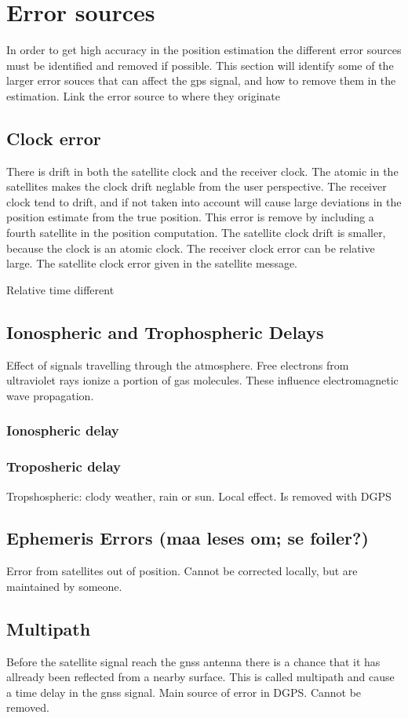 \section{Error sources}
In order to get high accuracy in the position estimation the different error sources must be identified and removed if possible. This section will identify some of the larger error souces that can affect the gps signal, and how to remove them in the estimation.
Link the error source to where they originate
\subsection{Clock error}
There is drift in both the satellite clock and the receiver clock. The atomic in the satellites makes the clock drift neglable from the user perspective. The receiver clock tend to drift, and if not taken into account will cause large deviations in the position estimate from the true position. This error is remove by including a fourth satellite in the position computation.  The satellite clock drift is smaller, because the clock is an atomic clock. The receiver clock error can be relative large. The satellite clock error given in the satellite message. 

Relative time different
\subsection{Ionospheric and Trophospheric Delays}
Effect of signals travelling through the atmosphere. Free electrons from ultraviolet rays ionize a portion of gas molecules. These influence electromagnetic wave propagation.
\subsubsection{Ionospheric delay}
\subsubsection{Troposheric delay}


Tropshospheric: clody weather, rain or sun. Local effect. Is removed with DGPS
\subsection{Ephemeris Errors (maa leses om; se foiler?)}
Error from satellites out of position. Cannot be corrected locally, but are maintained by someone.
\subsection{Multipath}
Before the satellite signal reach the gnss antenna there is a chance that it has allready been reflected from a nearby surface. This is called multipath and cause a time delay in the gnss signal. 
Main source of error in DGPS. Cannot be removed.
